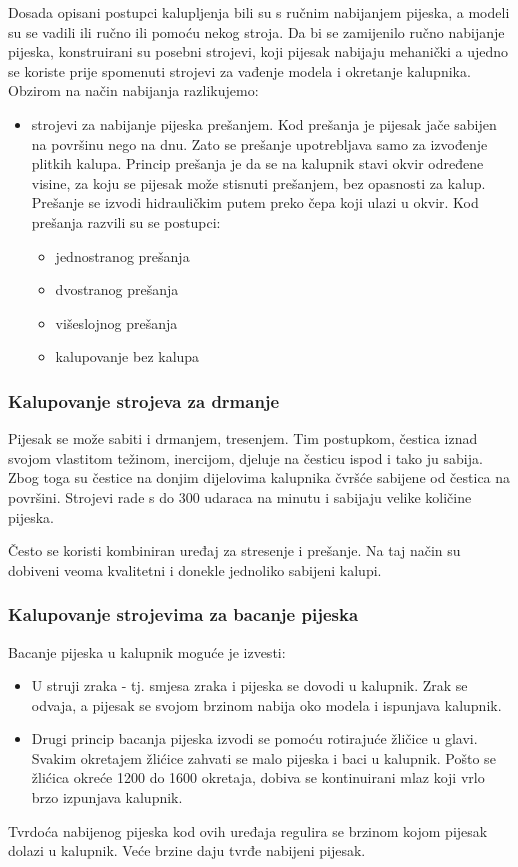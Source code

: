 \documentclass[a4paper,12pt]{article}
\numberwithin{figure}{section}
\begin{document}
Dosada opisani postupci kalupljenja bili su s ručnim nabijanjem pijeska, a modeli su se vadili ili ručno ili pomoću nekog stroja. Da bi se zamijenilo ručno nabijanje pijeska, konstruirani su posebni strojevi, koji pijesak nabijaju mehanički a ujedno se koriste prije spomenuti strojevi za vađenje modela i okretanje kalupnika. Obzirom na način nabijanja razlikujemo:
\begin{itemize}
\item strojevi za nabijanje pijeska prešanjem. Kod prešanja je pijesak jače sabijen na površinu nego na dnu. Zato se prešanje upotrebljava samo za izvođenje plitkih kalupa. Princip prešanja je da se na kalupnik stavi okvir određene visine, za koju se pijesak može stisnuti prešanjem, bez opasnosti za kalup. Prešanje se izvodi hidrauličkim putem preko čepa koji ulazi u okvir. Kod prešanja razvili su se postupci:
\begin{itemize}
\item jednostranog prešanja
\item dvostranog prešanja
\item višeslojnog prešanja
\item kalupovanje bez kalupa
\end{itemize}
\end{itemize}
\subsubsection{Kalupovanje strojeva za drmanje}
Pijesak se može sabiti i drmanjem, tresenjem. Tim postupkom, čestica iznad svojom vlastitom težinom, inercijom, djeluje na česticu ispod i tako ju sabija. Zbog toga su čestice na donjim dijelovima kalupnika čvršće sabijene od čestica na površini. Strojevi rade s do 300 udaraca na minutu i sabijaju velike količine pijeska. \par
Često se koristi kombiniran uređaj za stresenje i prešanje. Na taj način su dobiveni veoma kvalitetni i donekle jednoliko sabijeni kalupi.
\subsubsection{Kalupovanje strojevima za bacanje pijeska}
Bacanje pijeska u kalupnik moguće je izvesti:
\begin{itemize}
\item U struji zraka - tj. smjesa zraka i pijeska se dovodi u kalupnik. Zrak se odvaja, a pijesak se svojom brzinom nabija oko modela i ispunjava kalupnik.
\item Drugi princip bacanja pijeska izvodi se pomoću rotirajuće žličice u glavi. Svakim okretajem žlićice zahvati se malo pijeska i baci u kalupnik. Pošto se žlićica okreće 1200 do 1600 okretaja, dobiva  se kontinuirani mlaz koji vrlo brzo izpunjava kalupnik.
\end{itemize}
Tvrdoća nabijenog pijeska kod ovih uređaja regulira se brzinom kojom pijesak dolazi u kalupnik. Veće brzine daju tvrđe nabijeni pijesak.
\end{document}
